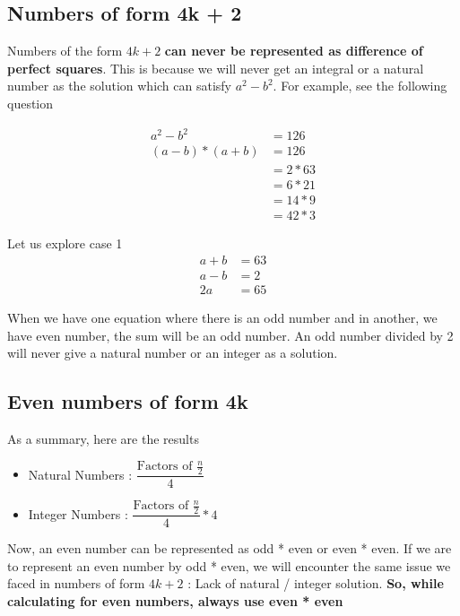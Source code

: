 \subsection{Numbers of form 4k + 2}

Numbers of the form $4k + 2$ \textbf{can never be represented as difference of perfect squares}. This is because we will never get an integral or a natural number as the solution which can satisfy $a^2 - b^2$. For example, see the following question


\begin{align*}
    a^2 - b^2 &= 126 \\
    (a - b) * (a + b) &= 126 \\
    &= 2 * 63 \tag{Case 1} \\
    &= 6 * 21 \tag{Case 2} \\
    &= 14 * 9 \tag{Case 3} \\
    &= 42 * 3 \tag{Case 4} 
\end{align*}

Let us explore case 1
\begin{align*}
    a + b &= 63 \\
    a - b &= 2 \\
    2a &= 65 \tag{Add both equations}
\end{align*}

When we have one equation where there is an odd number and in another, we have even number, the sum will be an odd number. An odd number divided by 2 will never give a natural number or an integer as a solution. 

\subsection{Even numbers of form 4k}

As a summary, here are the results
\begin{itemize}
    \item Natural Numbers : $\dfrac{\text{Factors of $\frac{n}{2}$}}{4}$
    \item Integer Numbers : $\dfrac{\text{Factors of $\frac{n}{2}$}}{4} * 4$
\end{itemize}

Now, an even number can be represented as odd * even or even * even. If we are to represent an even number by odd * even, we will encounter the same issue we faced in numbers of form $4k + 2$ : Lack of natural / integer solution. \textbf{So, while calculating for even numbers, always use even * even} \\


